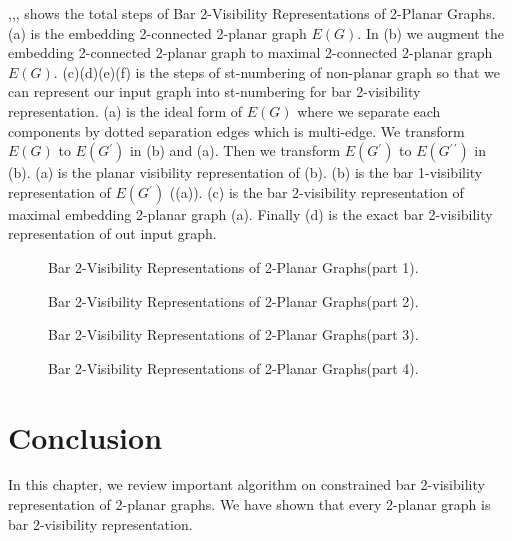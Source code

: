 ,,, shows the total steps of Bar 2-Visibility Representations of 2-Planar Graphs. (a) is the embedding 2-connected 2-planar graph $E(G)$. In (b) we augment the embedding 2-connected 2-planar graph to maximal 2-connected 2-planar graph $E(G)$. (c)(d)(e)(f) is the steps of st-numbering of non-planar graph so that we can represent our input graph into st-numbering for bar 2-visibility representation. (a) is the ideal form of $E(G)$ where we separate each components by dotted separation edges which is multi-edge. We transform $E(G)$ to $E(G{^\prime})$ in (b) and (a). Then we transform $E(G{^\prime})$ to $E(G{^\prime}{^\prime})$ in (b).  (a) is the planar visibility representation of  (b). (b) is the bar 1-visibility representation of $E(G{^\prime})$ ((a)). (c) is the bar 2-visibility representation of maximal embedding 2-planar graph (a). Finally  (d) is the exact bar 2-visibility representation of out input graph.


\begin{figure}[!tb]
\centering
\resizebox{150mm}{!}{}
\caption{Bar 2-Visibility Representations of 2-Planar Graphs(part 1).}
\label{fig:2p2v}
\end{figure}

\begin{figure}[!tb]
\centering
\resizebox{150mm}{!}{}
\caption{Bar 2-Visibility Representations of 2-Planar Graphs(part 2).}
\label{fig:2p2v1}
\end{figure}




\begin{figure}[!tb]
\centering
\resizebox{150mm}{!}{}
\caption{Bar 2-Visibility Representations of 2-Planar Graphs(part 3).}
\label{fig:2p2v11}
\end{figure}

\begin{figure}[!tb]
\centering
\resizebox{150mm}{!}{}
\caption{Bar 2-Visibility Representations of 2-Planar Graphs(part 4).}
\label{fig:2p2v2}
\end{figure}




\section{Conclusion}
In this chapter, we review important algorithm on constrained bar 2-visibility representation of 2-planar graphs. We have shown that every 2-planar graph is bar 2-visibility representation.






\endinput
